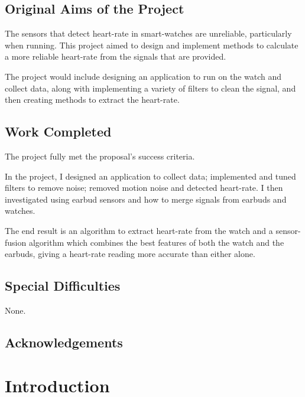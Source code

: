 \documentclass[12pt,a4paper,twoside,openany]{report}
\begin{document}
\section*{Original Aims of the Project}

The sensors that detect heart-rate in smart-watches are unreliable,
particularly when running. This project aimed to design and implement methods
to calculate a more reliable heart-rate from the signals that are provided.

The project would include designing an application to run on the watch and
collect data, along with implementing a variety of filters to clean the
signal, and then creating methods to extract the heart-rate.

\section*{Work Completed}

The project fully met the proposal’s success criteria.

In the project, I designed an application to collect data; implemented and
tuned filters to remove noise; removed motion noise and detected heart-rate. I
then investigated using earbud sensors and how to merge signals from earbuds
and watches.

The end result is an algorithm to extract heart-rate from the watch and a
sensor-fusion algorithm which combines the best features of both the watch and
the earbuds, giving a heart-rate reading more accurate than either alone.

\section*{Special Difficulties}

None.
 

\tableofcontents

\listoffigures

\newpage
\section*{Acknowledgements}



\pagestyle{headings}

\chapter{Introduction}
\end{document}

